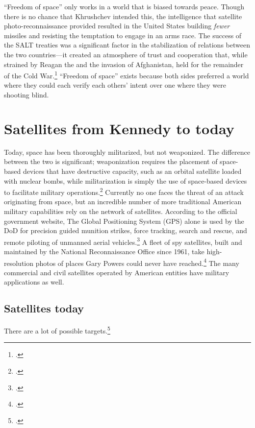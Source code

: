 \documentclass{report}
\begin{document}
``Freedom of space'' only works in a world that is biased towards peace. Though there is no chance that Khrushchev intended this, the intelligence that satellite photo-reconnaissance provided resulted in the United States building \emph{fewer} missiles and resisting the temptation to engage in an arms race. The success of the SALT treaties was a significant factor in the stabilization of relations between the two countries---it created an atmosphere of trust and cooperation that, while strained by Reagan the and the invasion of Afghanistan, held for the remainder of the Cold War.\footcite[p.~179]{lindgren_trust_2000} ``Freedom of space'' exists because both sides preferred a world where they could each verify each others' intent over one where they were shooting blind.


\section{Satellites from Kennedy to today}
Today, space has been thoroughly militarized, but not weaponized. The difference between the two is significant; weaponization requires the placement of space-based devices that have destructive capacity, such as an orbital satellite loaded with nuclear bombs, while militarization is simply the use of space-based devices to facilitate military operations.\footcite[p.~3]{mowthorpe_militarization_2004} Currently no one faces the threat of an attack originating from space, but an incredible number of more traditional American military capabilities rely on the network of satellites. According to the official government website, The Global Positioning System (GPS) alone is used by the DoD for precision guided munition strikes, force tracking, search and rescue, and remote piloting of unmanned aerial vehicles.\footcite{national_coordination_office_for_space-based_positioning_navigation_and_timing_federal_2018} A fleet of spy satellites, built and maintained by the National Reconnaissance Office since 1961, take high-resolution photos of places Gary Powers could never have reached.\footcite{national_reconnaissance_office_about_2019} The many commercial and civil satellites operated by American entities have military applications as well.

\subsection{Satellites today}
There are a lot of possible targets.\footcite[A few satellites are listed as dual-purpose (i.e. Government/Military), and those are counted twice, once for each purpose. For instance, the data shows that the US is currently operating 830 satellites, while adding up the bars in this chart would give you 966. I made this choice to emphasize the dependency of various social systems on the existing satellite infrastructure.]{union_of_concerned_scientists_ucs_2018}
\end{document}
